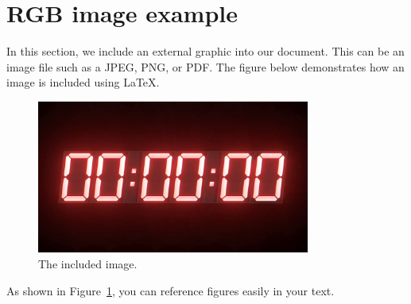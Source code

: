 \section{RGB image example}

In this section, we include an external graphic into our document. This can be an image file such as a JPEG, PNG, or PDF. The figure below demonstrates how an image is included using LaTeX.

\begin{figure}[htbp]
\centering
\includegraphics[width=0.8\textwidth]{66.png} %

\caption{The included image.} %
\label{fig:external-graphic} %
\end{figure}

As shown in Figure~\ref{fig:external-graphic}, you can reference figures easily in your text.
